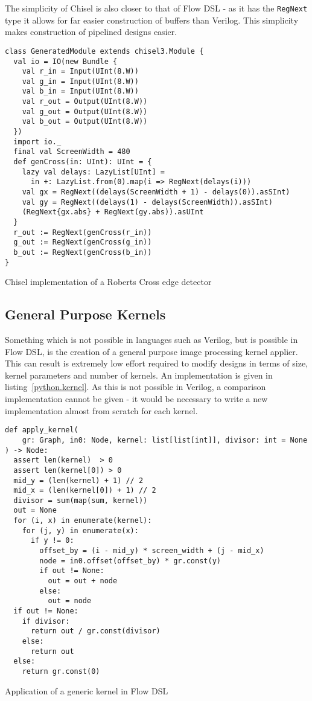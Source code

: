 The simplicity of Chisel is also closer to that of Flow DSL \hyphen{} as it has the \lstinline|RegNext| type it allows for far easier construction of buffers than Verilog. This simplicity makes construction of pipelined designs easier.

\begin{listing}[H]
  \begin{verbatim}
class GeneratedModule extends chisel3.Module {
  val io = IO(new Bundle {
    val r_in = Input(UInt(8.W))
    val g_in = Input(UInt(8.W))
    val b_in = Input(UInt(8.W))
    val r_out = Output(UInt(8.W))
    val g_out = Output(UInt(8.W))
    val b_out = Output(UInt(8.W))
  })
  import io._
  final val ScreenWidth = 480
  def genCross(in: UInt): UInt = {
    lazy val delays: LazyList[UInt] =
      in +: LazyList.from(0).map(i => RegNext(delays(i)))
    val gx = RegNext((delays(ScreenWidth + 1) - delays(0)).asSInt)
    val gy = RegNext((delays(1) - delays(ScreenWidth)).asSInt)
    (RegNext{gx.abs} + RegNext(gy.abs)).asUInt
  }
  r_out := RegNext(genCross(r_in))
  g_out := RegNext(genCross(g_in))
  b_out := RegNext(genCross(b_in))
}
\end{verbatim}
  \caption{Chisel implementation of a Roberts Cross edge detector}\label{chisel.robertscross}
\end{listing}

\subsection{General Purpose Kernels}
Something which is not possible in languages such as Verilog, but is possible in Flow DSL, is the creation of a general purpose image processing kernel applier. This can result is extremely low effort required to modify designs in terms of size, kernel parameters and number of kernels. An implementation is given in listing \ref{python.kernel}. As this is not possible in Verilog, a comparison implementation cannot be given \hyphen{} it would be necessary to write a new implementation almost from scratch for each kernel.

\begin{listing}[H]
  \begin{verbatim}
def apply_kernel(
    gr: Graph, in0: Node, kernel: list[list[int]], divisor: int = None
) -> Node:
  assert len(kernel)  > 0
  assert len(kernel[0]) > 0
  mid_y = (len(kernel) + 1) // 2
  mid_x = (len(kernel[0]) + 1) // 2
  divisor = sum(map(sum, kernel))
  out = None
  for (i, x) in enumerate(kernel):
    for (j, y) in enumerate(x):
      if y != 0:
        offset_by = (i - mid_y) * screen_width + (j - mid_x)
        node = in0.offset(offset_by) * gr.const(y)
        if out != None:
          out = out + node
        else:
          out = node
  if out != None:
    if divisor:
      return out / gr.const(divisor)
    else:
      return out
  else:
    return gr.const(0)
  \end{verbatim}
  \caption{Application of a generic kernel in Flow DSL}\label{python.kernel}
\end{listing}


